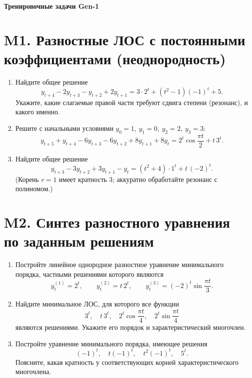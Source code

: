 \documentclass[12pt]{article}
\begin{document}
\begin{center}
\Large\textbf{Тренировочные задачи Gen-1}\\[2mm]
\end{center}

\section*{M1. Разностные ЛОС с постоянными коэффициентами (неоднородность)}
\begin{enumerate}
\item Найдите общее решение
\[
y_{t+4}-2y_{t+3}-y_{t+2}+2y_{t+1}=3\cdot 2^{t}+(t^2-1)(-1)^t+5.
\]
Укажите, какие слагаемые правой части требуют сдвига степени (резонанс), и какого именно.

\item Решите с начальными условиями $y_0=1,\ y_1=0,\ y_2=2,\ y_3=3$:
\[
y_{t+5}+y_{t+4}-6y_{t+3}-6y_{t+2}+8y_{t+1}+8y_t
=2^{t}\cos\frac{\pi t}{2}+t\,3^{t}.
\]

\item Найдите общее решение
\[
y_{t+3}-3y_{t+2}+3y_{t+1}-y_t
= (t^2+4)\cdot 1^t + t\,(-2)^t.
\]
(Корень $r=1$ имеет кратность $3$; аккуратно обработайте резонанс с полиномом.)
\end{enumerate}

\section*{M2. Синтез разностного уравнения по заданным решениям}
\begin{enumerate}
\item Постройте линейное однородное разностное уравнение минимального порядка, частными решениями которого являются
\[
y_t^{(1)}=2^t,\qquad
y_t^{(2)}=t\,2^t,\qquad
y_t^{(3)}=(-2)^t\sin\!\frac{\pi t}{3}.
\]

\item Найдите минимальное ЛОС, для которого все функции
\[
3^t,\quad t\,3^t,\quad 2^t\cos\!\frac{\pi t}{4},\quad 2^t\sin\!\frac{\pi t}{4}
\]
являются решениями. Укажите его порядок и характеристический многочлен.

\item Постройте уравнение минимального порядка, имеющее решения
\[
(-1)^t,\quad t(-1)^t,\quad t^2(-1)^t,\quad 5^t.
\]
Поясните, какая кратность у соответствующих корней характеристического многочлена.
\end{enumerate}
\end{document}
